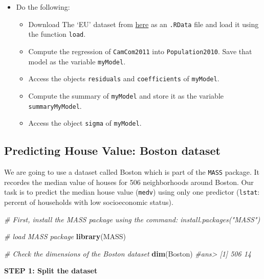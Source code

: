 \documentclass[]{book}
\newenvironment{Shaded}{\begin{snugshade}}{\end{snugshade}}
\newcommand{\KeywordTok}[1]{\textcolor[rgb]{0.13,0.29,0.53}{\textbf{#1}}}
\newcommand{\CommentTok}[1]{\textcolor[rgb]{0.56,0.35,0.01}{\textit{#1}}}
\newcommand{\NormalTok}[1]{#1}
\providecommand{\tightlist}{%
  \setlength{\itemsep}{0pt}\setlength{\parskip}{0pt}}
\newenvironment{rmdblock}[1]
  {\begin{shaded*}
  \begin{itemize}
  \renewcommand{\labelitemi}{
    \raisebox{-.7\height}[0pt][0pt]{
      {\setkeys{Gin}{width=2em,keepaspectratio}\texttt{[image: img/icons/\#1]}}
    }
  }
  \item
  }
  {
  \end{itemize}
  \end{shaded*}
  }
\newenvironment{rmdexercise}
  {\begin{rmdblock}{exercise}}
  {\end{rmdblock}}
\begin{document}
\begin{rmdexercise}
Do the following:

\begin{itemize}
\tightlist
\item
  Download The `EU' dataset from \href{datasets/EU.RData}{here} as an
  \texttt{.RData} file and load it using the function \texttt{load}.
\item
  Compute the regression of \texttt{CamCom2011} into
  \texttt{Population2010}. Save that model as the variable
  \texttt{myModel}.
\item
  Access the objects \texttt{residuals} and \texttt{coefficients} of
  \texttt{myModel}.
\item
  Compute the summary of \texttt{myModel} and store it as the variable
  \texttt{summaryMyModel}.
\item
  Access the object \texttt{sigma} of \texttt{myModel}.
\end{itemize}
\end{rmdexercise}

\subsection{Predicting House Value: Boston
dataset}\label{predicting-house-value-boston-dataset}

We are going to use a dataset called Boston which is part of the
\texttt{MASS} package. It recordes the median value of houses for 506
neighborhoods around Boston. Our task is to predict the median house
value (\texttt{medv}) using only one predictor (\texttt{lstat}: percent
of households with low socioeconomic status).

\begin{Shaded}
\begin{Highlighting}[]
\CommentTok{# First, install the MASS package using the command: install.packages("MASS")}

\CommentTok{# load MASS package}
\KeywordTok{library}\NormalTok{(MASS)}

\CommentTok{# Check the dimensions of the Boston dataset}
\KeywordTok{dim}\NormalTok{(Boston)}
\CommentTok{#ans> [1] 506  14}
\end{Highlighting}
\end{Shaded}

\textbf{STEP 1: Split the dataset}
\end{document}
